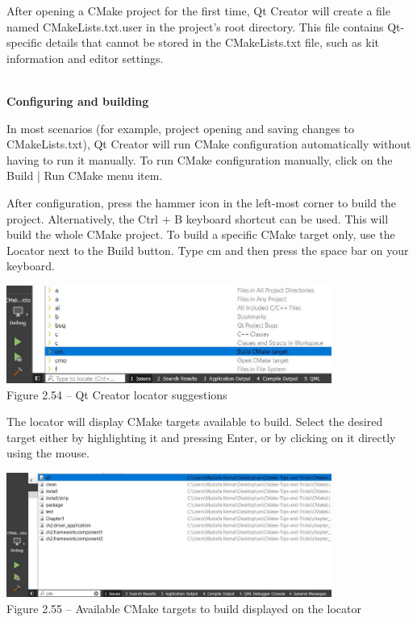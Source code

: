 After opening a CMake project for the first time, Qt Creator will create a file named CMakeLists.txt.user in the project's root directory. This file contains Qt-specific details that cannot be stored in the CMakeLists.txt file, such as kit information and editor settings.

\hspace*{\fill} \\ %
\noindent
\textbf{Configuring and building}

In most scenarios (for example, project opening and saving changes to CMakeLists.txt), Qt Creator will run CMake configuration automatically without having to run it manually. To run CMake configuration manually, click on the Build | Run CMake menu item.

After configuration, press the hammer icon in the left-most corner to build the project. Alternatively, the Ctrl + B keyboard shortcut can be used. This will build the whole CMake project. To build a specific CMake target only, use the Locator next to the Build button. Type cm and then press the space bar on your keyboard.

\begin{center}
\includegraphics[width=0.8\textwidth]{content/1/chapter2/images/54.jpg}\\
Figure 2.54 – Qt Creator locator suggestions
\end{center}

The locator will display CMake targets available to build. Select the desired target either by highlighting it and pressing Enter, or by clicking on it directly using the mouse.

\begin{center}
\includegraphics[width=0.8\textwidth]{content/1/chapter2/images/55.jpg}\\
Figure 2.55 – Available CMake targets to build displayed on the locator
\end{center}

